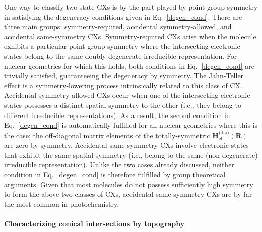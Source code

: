 \documentclass[9pt,bestpractices]{livecoms}
\newcommand{\R}{\mathbf{R}}
\begin{document}
One way to classify two-state CXs is by the part played by point group symmetry in satisfying the degeneracy conditions given in Eq.~\eqref{degen_cond}.
There are three main groups: symmetry-required, accidental symmetry-allowed, and accidental same-symmetry CXs.
Symmetry-required CXs arise when the molecule exhibits a particular point group symmetry where the intersecting electronic states belong to the same doubly-degenerate irreducible representation.
For nuclear geometries for which this holds, both conditions in Eq.~\eqref{degen_cond} are trivially satisfied, guaranteeing the degeneracy by symmetry.\cite{yarkony_nonadiabatic_2012}
The Jahn-Teller effect\cite{jahn1937stability} is a symmetry-lowering process intrinsically related to this class of CX.\cite{Persico2018}
Accidental symmetry-allowed CXs occur when one of the intersecting electronic states possesses a distinct spatial symmetry to the other (i.e., they belong to different irreducible representations).
As a result, the second condition in Eq.~\eqref{degen_cond} is automatically fulfilled for all nuclear geometries where this is the case;\cite{zhu_non-adiabaticity_2016} the off-diagonal matrix elements of the totally-symmetric $\mathbf{H}_{\text{el}}^{\text{(dia)}}(\R)$ are zero by symmetry.\cite{kjonstad2017crossing}
Accidental same-symmetry CXs involve electronic states that exhibit the same spatial symmetry (i.e., belong to the same (non-degenerate) irreducible representation).
Unlike the two cases already discussed, neither condition in Eq.~\eqref{degen_cond} is therefore fulfilled by group theoretical arguments.\cite{kjonstad2017crossing} 
Given that most molecules do not possess sufficiently high symmetry to form the above two classes of CXs, accidental same-symmetry CXs are by far the most common in photochemistry.\cite{matsika_electronic_2021}

\paragraph{Characterizing conical intersections by topography}
\label{ch2_topog}
\end{document}
